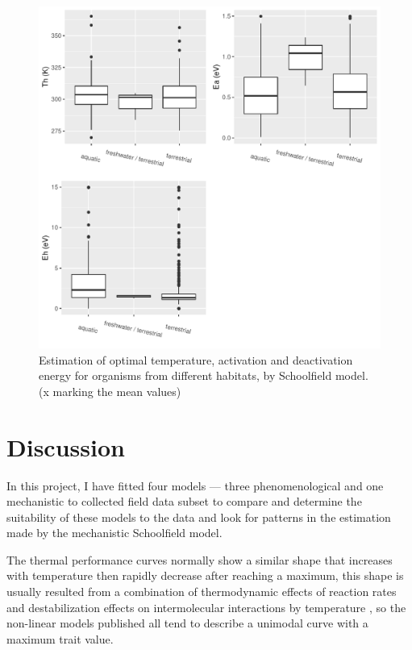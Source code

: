\documentclass[11pt, a4paper]{article}
\begin{document}
\begin{spacing}{1.5}
\begin{figure}[H]
    \centering
    \includegraphics[scale=0.6]{../results/habitat.pdf}
    \caption{Estimation of optimal temperature, activation and deactivation energy for organisms from different habitats, by Schoolfield model. (x marking the mean values)}
    \label{fig:habitat}
\end{figure}

\section{Discussion}
In this project, I have fitted four models --- three phenomenological and one mechanistic to collected field data subset to compare and determine the suitability of these models to the data and look for patterns in the estimation made by the mechanistic Schoolfield model. 

The thermal performance curves normally show a similar shape that increases with temperature then rapidly decrease after reaching a maximum, this shape is usually resulted from a combination of thermodynamic effects of reaction rates and destabilization effects on intermolecular interactions by temperature \citep{schulte2011thermal}, so the non-linear models published all tend to describe a unimodal curve with a maximum trait value. 


\end{spacing}
\end{document}
